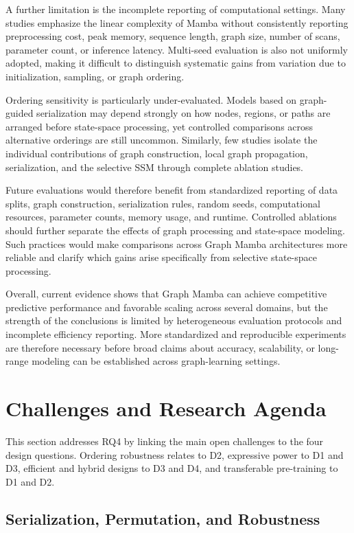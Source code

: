 \documentclass[acmsmall]{acmart}
\begin{document}
A further limitation is the incomplete reporting of computational settings.
Many studies emphasize the linear complexity of Mamba without consistently
reporting preprocessing cost, peak memory, sequence length, graph size, number
of scans, parameter count, or inference latency. Multi-seed evaluation is also
not uniformly adopted, making it difficult to distinguish systematic gains
from variation due to initialization, sampling, or graph ordering.

Ordering sensitivity is particularly under-evaluated. Models based on
graph-guided serialization may depend strongly on how nodes, regions, or paths
are arranged before state-space processing, yet controlled comparisons across
alternative orderings are still uncommon. Similarly, few studies isolate the
individual contributions of graph construction, local graph propagation,
serialization, and the selective SSM through complete ablation studies.

Future evaluations would therefore benefit from standardized reporting of data
splits, graph construction, serialization rules, random seeds, computational
resources, parameter counts, memory usage, and runtime. Controlled ablations
should further separate the effects of graph processing and state-space
modeling. Such practices would make comparisons across Graph Mamba
architectures more reliable and clarify which gains arise specifically from
selective state-space processing.

Overall, current evidence shows that Graph Mamba can achieve competitive
predictive performance and favorable scaling across several domains, but the
strength of the conclusions is limited by heterogeneous evaluation protocols
and incomplete efficiency reporting. More standardized and reproducible
experiments are therefore necessary before broad claims about accuracy,
scalability, or long-range modeling can be established across graph-learning
settings.

\section{Challenges and Research Agenda}
\label{sec6}

This section addresses RQ4 by linking the main open challenges to the four design questions. Ordering robustness relates to D2, expressive power to D1 and D3, efficient and hybrid designs to D3 and D4, and transferable pre-training to D1 and D2.

\subsection{Serialization, Permutation, and Robustness}
\label{sec:ch-serialization-robustness}
\end{document}

